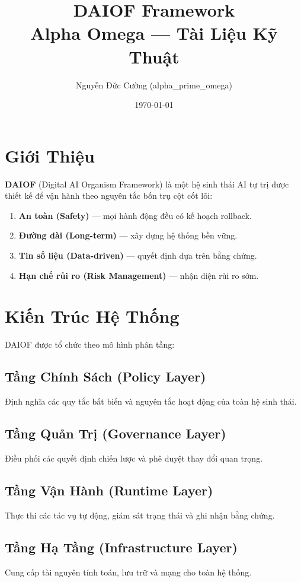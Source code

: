 \documentclass[12pt,a4paper]{article}
\title{\textbf{DAIOF Framework}\\[0.5em]
       \large Alpha Omega — Tài Liệu Kỹ Thuật}
\author{Nguyễn Đức Cường (alpha\_prime\_omega)}
\date{\today}
\begin{document}
\maketitle
\tableofcontents
\newpage

\section{Giới Thiệu}

\textbf{DAIOF} (Digital AI Organism Framework) là một hệ sinh thái AI tự trị được thiết kế
để vận hành theo nguyên tắc bốn trụ cột cốt lõi:

\begin{enumerate}
  \item \textbf{An toàn (Safety)} — mọi hành động đều có kế hoạch rollback.
  \item \textbf{Đường dài (Long-term)} — xây dựng hệ thống bền vững.
  \item \textbf{Tin số liệu (Data-driven)} — quyết định dựa trên bằng chứng.
  \item \textbf{Hạn chế rủi ro (Risk Management)} — nhận diện rủi ro sớm.
\end{enumerate}

\section{Kiến Trúc Hệ Thống}

DAIOF được tổ chức theo mô hình phân tầng:

\subsection{Tầng Chính Sách (Policy Layer)}
Định nghĩa các quy tắc bất biến và nguyên tắc hoạt động của toàn hệ sinh thái.

\subsection{Tầng Quản Trị (Governance Layer)}
Điều phối các quyết định chiến lược và phê duyệt thay đổi quan trọng.

\subsection{Tầng Vận Hành (Runtime Layer)}
Thực thi các tác vụ tự động, giám sát trạng thái và ghi nhận bằng chứng.

\subsection{Tầng Hạ Tầng (Infrastructure Layer)}
Cung cấp tài nguyên tính toán, lưu trữ và mạng cho toàn hệ thống.
\end{document}
